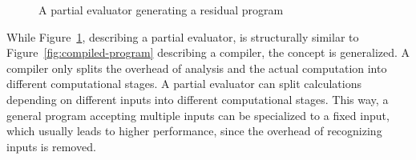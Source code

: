\begin{figure}[h]
  \centering
  \caption{A partial evaluator generating a residual program}\label{fig:partial-evaluated-program}
\end{figure}

While Figure~\ref{fig:partial-evaluated-program}, describing a partial evaluator, is structurally similar to Figure~\ref{fig:compiled-program} describing a compiler, the concept is generalized.
A compiler only splits the overhead of analysis and the actual computation into different computational stages.
A partial evaluator can split calculations depending on different inputs into different computational stages.
This way, a general program accepting multiple inputs can be specialized to a fixed input, which usually leads to higher performance, since the overhead of recognizing inputs is removed.



